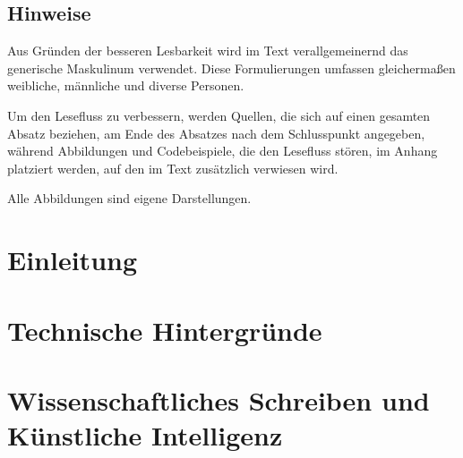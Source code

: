 \documentclass[
	12pt, %
	a4paper,
	bibliography=totoc, %
	numbers=noenddot, %
	ngerman, %
	headsepline, %
	oneside %
	]{scrbook} %
\begin{document}
\newpage

\tableofcontents{}


\listoffigures
{}


\section*{Hinweise}

Aus Gründen der besseren Lesbarkeit wird im Text verallgemeinernd das generische Maskulinum verwendet. Diese Formulierungen umfassen gleichermaßen weibliche, männliche und diverse Personen.

Um den Lesefluss zu verbessern, werden Quellen, die sich auf einen gesamten Absatz beziehen, am Ende des Absatzes nach dem Schlusspunkt angegeben, während Abbildungen und Codebeispiele, die den
Lesefluss stören, im Anhang platziert werden, auf den im Text zusätzlich verwiesen wird. 

Alle Abbildungen sind eigene Darstellungen.
\clearpage




\printnoidxglossaries{}

\clearpage



\chapter{Einleitung}\label{ch:einleitung}


\chapter{Technische Hintergründe}\label{ch:technischeHintergründe}


\chapter{Wissenschaftliches Schreiben und Künstliche Intelligenz}\label{ch:wissenschaftlichesSchreibenUndKI}

\end{document}

